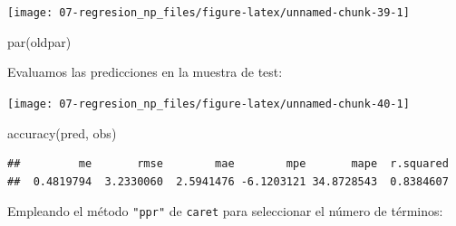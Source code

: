 \documentclass[
]{book}
\newenvironment{Shaded}{\begin{snugshade}}{\end{snugshade}}
\newcommand{\AttributeTok}[1]{\textcolor[rgb]{0.77,0.63,0.00}{#1}}
\newcommand{\DecValTok}[1]{\textcolor[rgb]{0.00,0.00,0.81}{#1}}
\newcommand{\FunctionTok}[1]{\textcolor[rgb]{0.00,0.00,0.00}{#1}}
\newcommand{\NormalTok}[1]{#1}
\newcommand{\OtherTok}[1]{\textcolor[rgb]{0.56,0.35,0.01}{#1}}
\newcommand{\SpecialCharTok}[1]{\textcolor[rgb]{0.00,0.00,0.00}{#1}}
\newcommand{\StringTok}[1]{\textcolor[rgb]{0.31,0.60,0.02}{#1}}
\theoremstyle{break}
\theoremstyle{definition}
\theoremstyle{definition}
\theoremstyle{definition}
\theoremstyle{definition}
\theoremstyle{remark}
\begin{document}
\begin{center}\texttt{[image: 07-regresion\_np\_files/figure-latex/unnamed-chunk-39-1]} \end{center}

\begin{Shaded}
\begin{Highlighting}[]
\FunctionTok{par}\NormalTok{(oldpar)}
\end{Highlighting}
\end{Shaded}

Evaluamos las predicciones en la muestra de test:

\begin{Shaded}
\end{Shaded}

\begin{center}\texttt{[image: 07-regresion\_np\_files/figure-latex/unnamed-chunk-40-1]} \end{center}

\begin{Shaded}
\begin{Highlighting}[]
\FunctionTok{accuracy}\NormalTok{(pred, obs)}
\end{Highlighting}
\end{Shaded}

\begin{verbatim}
##         me       rmse        mae        mpe       mape  r.squared 
##  0.4819794  3.2330060  2.5941476 -6.1203121 34.8728543  0.8384607
\end{verbatim}

Empleando el método \texttt{"ppr"} de \texttt{caret} para seleccionar el número de términos:
\end{document}

